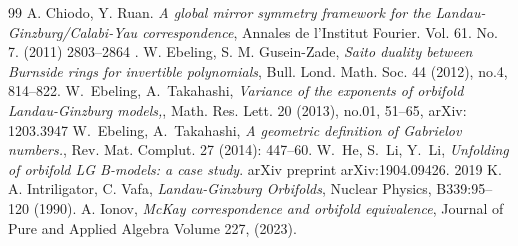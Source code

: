 \documentclass[reqno,12pt]{amsart}
\numberwithin{equation}{section}
\theoremstyle{plain}
\theoremstyle{definition}
\numberwithin{equation}{section}
\begin{document}
\begin{thebibliography}{99}
%     
    A. Chiodo, Y. Ruan.
    {\it A global mirror symmetry framework for the Landau-Ginzburg/Calabi-Yau correspondence},
    Annales de l'Institut Fourier. Vol. 61. No. 7. (2011) 2803--2864 .
    W. Ebeling, S. M. Gusein-Zade, \emph{Saito duality between Burnside rings for invertible polynomials}, Bull. Lond. Math. Soc. 44 (2012), no.4, 814–822. 
	W.~Ebeling, A.~Takahashi, \emph{Variance of the exponents of orbifold Landau-Ginzburg models,}, Math. Res. Lett. 20 (2013), no.01, 51–65, arXiv: 1203.3947
	W.~Ebeling, A.~Takahashi, \emph{A geometric definition of Gabrielov numbers.}, Rev. Mat. Complut. 27 (2014): 447–60.
    W.~He, S.~Li, Y.~Li, \emph{Unfolding of orbifold LG B-models: a case study}. arXiv preprint arXiv:1904.09426. 2019
    K. A. Intriligator, C. Vafa, \emph{Landau-Ginzburg Orbifolds}, Nuclear Physics, B339:95–120 (1990).
    A. Ionov, \emph{McKay correspondence and orbifold equivalence}, Journal of Pure and Applied Algebra Volume 227, (2023).

\end{thebibliography}
\end{document}
